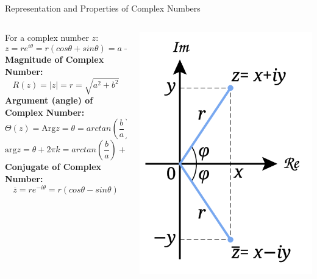 \documentclass{beamer}
\begin{document}
\begin{frame}[t]{Representation and Properties of Complex Numbers}
    \begin{columns}
        \hspace{0.5em}
		\begin{column}{.7\textwidth}
            For a complex number $z$:
            \[z = r e^{i \theta} = r(cos\theta + sin \theta) = a + b i\]
            \textbf{Magnitude of Complex Number:}
            \[R(z) = |z| = r = \sqrt{a^2 + b^2}\]
            \textbf{Argument (angle) of Complex Number:}
            \[\Theta(z) = \text{Arg} z = \theta = arctan(\frac{b}{a}) \text{ for } -\pi \leq \theta < \pi\]
            \[\text{arg} z = \theta + 2 \pi k  = arctan(\frac{b}{a}) + 2 \pi k \text{ for k } \in \mathbb{Z}\]
            \textbf{Conjugate of Complex Number:}
            \[ \overline{z} = r e ^{-i \theta} = r(cos \theta - sin\theta)\]
		\end{column}
        \hspace{0em}
		\begin{column}{.3\textwidth}
            \begin{center}
                \includegraphics[width=1.0\textwidth]{./img/complex_conjugate.png}
            \end{center}
		\end{column}
        \hspace{2em}
	\end{columns}
\end{frame}
\end{document}
